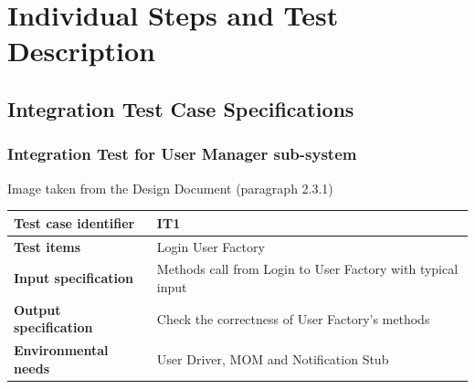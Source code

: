 \documentclass{article}
\begin{document}
	\section{Individual Steps and Test Description}
		\subsection{Integration Test Case Specifications}
			\subsubsection{Integration Test for User Manager sub-system} \label{sec:3.1.1}
				\begin{minipage}{\linewidth}
				\end{minipage}
				\begin{center}
					Image taken from the Design Document (paragraph 2.3.1)
				\end{center}
				\begin{center}
					\setlength{\tabcolsep}{24pt}
					\renewcommand{\arraystretch}{1.4}
					\begin{tabular}{ | l | p{8cm} |}\hline
						\textbf{Test case identifier} & IT1\\\hline
						\textbf{Test items} & Login \textrightarrow User Factory\\\hline
						\textbf{Input specification} & Methods call from Login to User Factory with typical input \\\hline
						\textbf{Output specification} & Check the correctness of User Factory's methods  \\\hline
						\textbf{Environmental needs} & User Driver, MOM and Notification Stub\\\hline
					\end{tabular}
				\end{center}	
\end{document}
